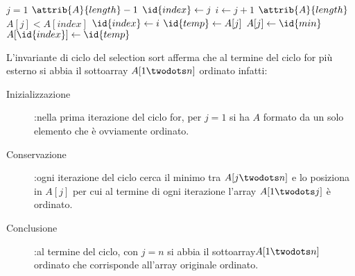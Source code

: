 \begin{codebox}
\li \For $j = 1$ \To $\attrib{A}{length} - 1$
    \Do
\li           $\id{index} \gets j$
\li           \For $i \gets j+1$ \To $\attrib{A}{length}$
              \Do
\li                  \If $A[j] < A[index]$
                     \Then
\li                         $\id{index} \gets i$
                     \End
              \End
\li           $\id{temp} \gets A[j]$
\li           $A[j] \gets \id{min}$
\li           $A[\id{index}] \gets \id{temp}$
\end{codebox}

L'invariante di ciclo del selection sort afferma che al termine del ciclo for
più esterno  si abbia il sottoarray $A[1 \twodots n]$ ordinato infatti:
\begin{description}
  \item[Inizializzazione]:nella prima iterazione del ciclo for, per $j = 1$ si ha
        $A$ formato da un solo elemento che è ovviamente ordinato.
  \item[Conservazione]:ogni iterazione del ciclo cerca il minimo tra $A[j \twodots n]$
        e lo posiziona in $A[j]$ per cui al termine di ogni iterazione l'array $A[1 \twodots j]$ è ordinato.
  \item[Conclusione]:al termine del ciclo, con $j = n$ si abbia il sottoarray$A[1 \twodots n]$
        ordinato che corrisponde all'array originale ordinato.
\end{description}

